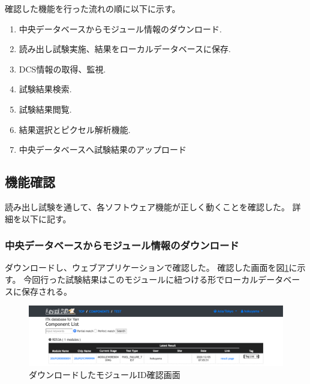 確認した機能を行った流れの順に以下に示す。
\begin{enumerate}
  \item 中央データベースからモジュール情報のダウンロード.
  \item 読み出し試験実施、結果をローカルデータベースに保存.
  \item DCS情報の取得、監視.
  \item 試験結果検索.
  \item 試験結果閲覧.
  \item 結果選択とピクセル解析機能.
  \item 中央データベースへ試験結果のアップロード
\end{enumerate}

\subsection{機能確認}
読み出し試験を通して、各ソフトウェア機能が正しく動くことを確認した。
詳細を以下に記す。

\subsubsection{中央データベースからモジュール情報のダウンロード}
ダウンロードし、ウェブアプリケーションで確認した。
確認した画面を図\ref{demo_download_SCC}に示す。
今回行った試験結果はこのモジュールに紐つける形でローカルデータベースに保存される。

\begin{figure}[bpt]\centering
\includegraphics[width=14cm]{demo_download_SCC}
\caption[ダウンロードしたモジュールID確認画面]{ダウンロードしたモジュールID確認画面}
\label{demo_download_SCC}
\end{figure}


\clearpage
